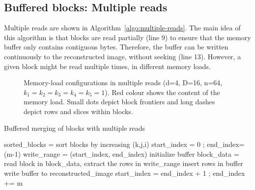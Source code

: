 \documentclass[10pt, conference, compsocconf]{IEEEtran}
\begin{document}

   
\subsection{Buffered blocks: Multiple reads}

Multiple reads are shown in Algorithm~\ref{algo:multiple-reads}.  The
main idea of this algorithm is that blocks are read partially (line 9)
to ensure that the memory buffer only contains contiguous
bytes. Therefore, the buffer can be written continuously to the
reconstructed image, without seeking (line 13).  However, a given
block might be read multiple times, in different memory loads.

\begin{figure}
\centering
\def\svgwidth{0.3\columnwidth}

\def\svgwidth{0.3\columnwidth}

\def\svgwidth{0.3\columnwidth}


\medskip

\def\svgwidth{0.3\columnwidth}

\def\svgwidth{0.3\columnwidth}

\caption{Memory-load configurations in multiple reads (d=4, D=16,
  n=64, $k_1=k_2=k_3=k_4=k_5=1$). Red colour shows the content of the
  memory load. Small dots depict block frontiers and long dashes
  depict rows and slices within blocks.}
\label{fig:multiple-reads-cases}
\end{figure}



\begin{algorithm}[h]
  \caption{Buffered merging of blocks with multiple reads}
  \label{algo:multiple-reads}
  \begin{algorithmic}[1]
  \STATE sorted\_blocks = sort blocks by increasing (k,j,i)
  \STATE start\_index = 0 ; end\_index=(m-1)
  \STATE write\_range = (start\_index, end\_index)
    \STATE initialize buffer
        \STATE block\_data = read block
        \STATE in block\_data, extract the rows in write\_range
        \STATE insert rows in buffer
      \ENDIF
    \ENDFOR
    \STATE write buffer to reconstructed\_image
    \STATE start\_index = end\_index + 1 ; end\_index += m
  \ENDWHILE

  \end{algorithmic}
\end{algorithm}
\end{document}
